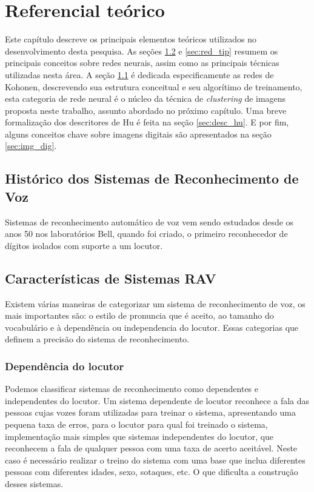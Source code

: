 \chapter{Referencial teórico}

Este capítulo descreve os principais elementos teóricos utilizados no
desenvolvimento desta pesquisa. As seções \ref{sec:red_neu} e \ref{sec:red_tip}
resumem os principais conceitos sobre redes neurais, assim como as principais
técnicas utilizadas nesta área. A seção \ref{sec:red_khn} é dedicada
especificamente as redes de Kohonen, descrevendo sua estrutura conceitual e seu
algorítimo de treinamento, esta categoria de rede neural é o núcleo da técnica
de \textit{clustering} de imagens proposta neste trabalho, assunto abordado no
próximo capítulo. Uma breve formalização dos descritores de Hu é feita na seção
\ref{sec:desc_hu}. E por fim, alguns conceitos chave sobre imagens digitais são
apresentados na seção \ref{sec:img_dig}.

\section{Histórico dos Sistemas de Reconhecimento de Voz}\label{sec:red_khn}

Sistemas de reconhecimento automático de voz vem sendo estudados desde os anos 50 nos laboratórios Bell, quando foi criado, o primeiro reconhecedor de dígitos isolados com suporte a um locutor.\cite{Historico1}

\section{Características de Sistemas RAV}\label{sec:red_neu}

Existem várias maneiras de categorizar um sistema de reconhecimento de voz, os mais importantes são: o estilo de pronuncia que é aceito, ao tamanho do vocabulário e à dependência ou independencia do locutor. \cite{Carac1} Essas categorias que definem a precisão do sistema de reconhecimento.

\subsection{Dependência do locutor}
Podemos classificar sistemas de reconhecimento como dependentes e independentes do locutor. Um sistema dependente de locutor reconhece a fala das pessoas cujas vozes foram utilizadas para treinar o sistema, apresentando uma pequena taxa de erros, para o locutor para qual foi treinado o sistema,  implementação mais simples que sistemas independentes do locutor, que reconhecem a fala de qualquer pessoa com uma taxa de acerto aceitável. Neste caso é necessário realizar o treino do sistema com uma base que inclua diferentes pessoas com diferentes idades, sexo, sotaques, etc. O que dificulta a construção desses sistemas.

